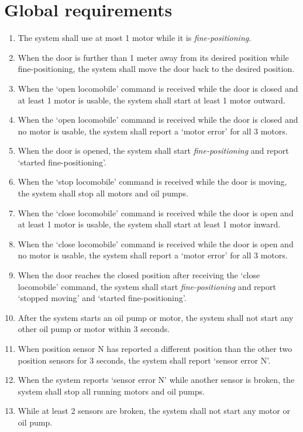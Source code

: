 \documentclass{article}
\begin{document}
\section{Global requirements}
\begin{enumerate}
    \item The system shall use at most 1 motor while it is \textit{fine-positioning}.
    \item When the door is further than 1 meter away from its desired position while fine-positioning, the system shall move the door back to the desired position.

    \item When the {\lq}open locomobile{\rq} command is received while the door is closed and at least 1 motor is usable, the system shall start at least 1 motor outward.
    \item When the {\lq}open locomobile{\rq} command is received while the door is closed and no motor is usable, the system shall report a {\lq}motor error{\rq} for all 3 motors.

    \item When the door is opened, the system shall start \textit{fine-positioning} and
    report {\lq}started fine-positioning{\rq}.

    \item When the {\lq}stop locomobile{\rq} command is received while the door is moving, the system shall stop all motors and oil pumps.

    \item When the {\lq}close locomobile{\rq} command is received while the door is open and at least 1 motor is usable, the system shall start at least 1 motor inward.
    \item When the {\lq}close locomobile{\rq} command is received while the door is open and no motor is usable, the system shall report a {\lq}motor error{\rq} for all 3 motors.
    
    \item When the door reaches the closed position after receiving the 
    {\lq}close locomobile{\rq} command, the system shall start \textit{fine-positioning} and report {\lq}stopped moving{\rq} and {\lq}started fine-positioning{\rq}.

    \item After the system starts an oil pump or motor, the system shall not start
    any other oil pump or motor within 3 seconds. %
    \item When position sensor N has reported a different position than the other two
    position sensors for 3 seconds, the system shall report {\lq}sensor error N{\rq}.
    \item When the system reports {\lq}sensor error N{\rq} while another sensor is broken, the
    system shall stop all running motors and oil pumps.
    \item While at least 2 sensors are broken, the system shall not start any motor or
    oil pump.


\end{enumerate}
\end{document}
